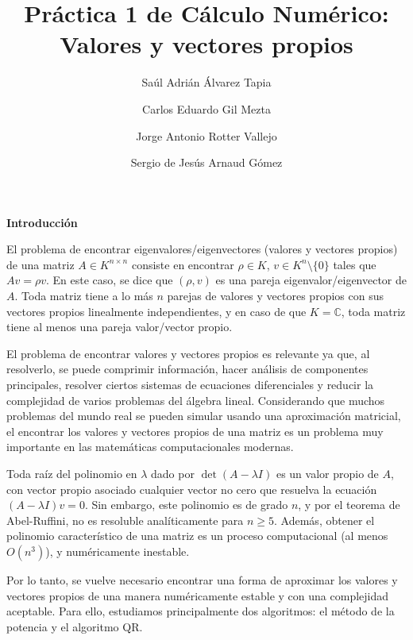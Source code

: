 \documentclass[11pt]{article}
\begin{document}
\author{Saúl Adrián Álvarez Tapia \and Carlos Eduardo Gil Mezta \and Jorge Antonio Rotter Vallejo \and Sergio de Jesús Arnaud Gómez}

\title{\Huge Práctica 1 de Cálculo Numérico: Valores y vectores propios}
\date{}
\maketitle

\noindent
\textbf{\LARGE{Introducción}}

\noindent
El problema de encontrar eigenvalores/eigenvectores (valores y vectores propios) de una matriz $A\in K^{n\times n}$ consiste en encontrar $\rho \in K$, $v\in K^n\setminus\{0\}$ tales que $Av=\rho v$. En este caso, se dice que $(\rho,v)$ es una pareja eigenvalor/eigenvector de $A$. Toda matriz tiene a lo más $n$ parejas de valores y vectores propios con sus vectores propios linealmente independientes, y en caso de que $K=\mathbb{C}$, toda matriz tiene al menos una pareja valor/vector propio.



El problema de encontrar valores y vectores propios es relevante ya que, al resolverlo, se puede comprimir información, hacer análisis de componentes principales, resolver ciertos sistemas de ecuaciones diferenciales y reducir la complejidad de varios problemas del álgebra lineal. Considerando que muchos problemas del mundo real se pueden simular usando una aproximación matricial, el encontrar los valores y vectores propios de una matriz es un problema muy importante en las matemáticas computacionales modernas.



Toda raíz del polinomio en $\lambda$ dado por $\det(A-\lambda I)$ es un valor propio de $A$, con vector propio asociado cualquier vector no cero que resuelva la ecuación $(A-\lambda I)v=0$. Sin embargo, este polinomio es de grado $n$, y por el teorema de Abel-Ruffini, no es resoluble analíticamente para $n\geq 5$. Además, obtener el polinomio característico de una matriz es un proceso computacional (al menos $O(n^3)$), y numéricamente inestable.



Por lo tanto, se vuelve necesario encontrar una forma de aproximar los valores y vectores propios de una manera numéricamente estable y con una complejidad aceptable. Para ello, estudiamos principalmente dos algoritmos: el método de la potencia y el algoritmo QR.
\end{document}
